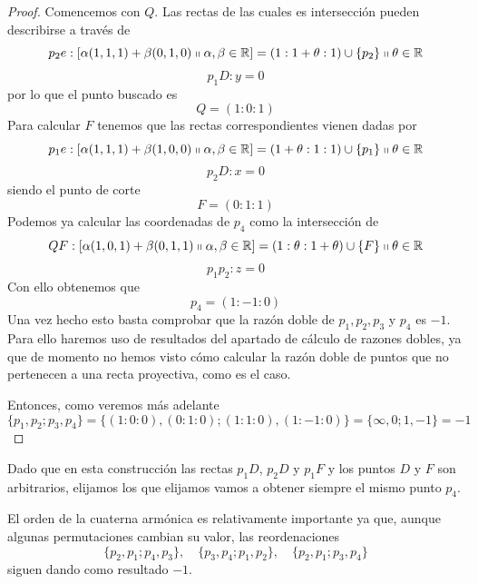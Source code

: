 \begin{proof}
	Comencemos con $Q$. Las rectas de las cuales es intersección pueden describirse a través de 
	\begin{equation*}
		p_2e:\left [ \alpha(1,1,1)+\beta(0,1,0)\shortparallel\alpha,\beta\in \mathbb{R} \right ]=(1:1+\theta:1)\cup\{p_2\}\shortparallel\theta\in\mathbb{R}
	\end{equation*}
	\begin{equation*}
		p_1D:y=0
	\end{equation*}
	por lo que el punto buscado es
	\[Q=(1:0:1)\]
	Para calcular $F$ tenemos que las rectas correspondientes vienen dadas por
	\begin{equation*}
		p_1e:\left [ \alpha(1,1,1)+\beta(1,0,0)\shortparallel\alpha,\beta\in \mathbb{R} \right ]=(1+\theta:1:1)\cup\{p_1\}\shortparallel\theta\in\mathbb{R}
	\end{equation*}
	\begin{equation*}
		p_2D:x=0
	\end{equation*}
	siendo el punto de corte
	\[F=(0:1:1)\]
	Podemos ya calcular las coordenadas de $p_4$ como la intersección de 
	\begin{equation*}
		QF:\left [ \alpha(1,0,1)+\beta(0,1,1)\shortparallel\alpha,\beta\in \mathbb{R} \right ]=(1:\theta:1+\theta)\cup\{F\}\shortparallel\theta\in\mathbb{R}
	\end{equation*}
	\begin{equation*}
		p_1p_2:z=0
	\end{equation*}
	Con ello obtenemos que
	\[p_4=(1:-1:0)\]
	Una vez hecho esto basta comprobar que la razón doble de $p_1,p_2,p_3$ y $p_4$ es $-1$. Para ello haremos uso de resultados del apartado de cálculo de razones dobles, ya que de momento no hemos visto cómo calcular la razón doble de puntos que no pertenecen a una recta proyectiva, como es el caso.
	
	Entonces, como veremos más adelante
	\begin{equation}
		\{p_1,p_2;p_3,p_4\}=\{(1:0:0),(0:1:0);(1:1:0),(1:-1:0)\}=\{\infty,0;1,-1\}=-1
	\end{equation}
\end{proof}
Dado que en esta construcción las rectas $p_1D$, $p_2D$ y $p_1F$ y los puntos $D$ y $F$ son arbitrarios, elijamos los que elijamos vamos a obtener siempre el mismo punto $p_4$. 

El orden de la cuaterna armónica es relativamente importante ya que, aunque algunas permutaciones cambian su valor, las reordenaciones
\begin{equation*}
	\{p_2,p_1;p_4,p_3\}, \quad \{p_3,p_4;p_1,p_2\}, \quad \{p_2,p_1;p_3,p_4\}
\end{equation*}
siguen dando como resultado $-1$.

